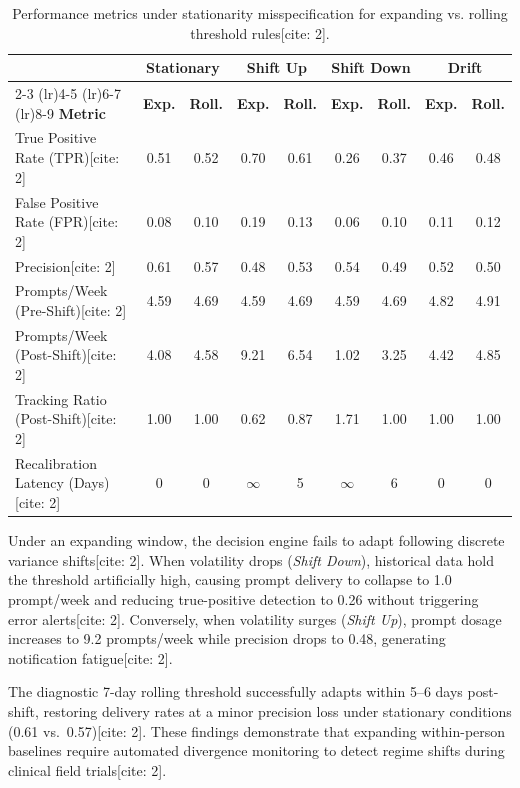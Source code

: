 \documentclass[11pt,letterpaper]{article}
\begin{document}
\begin{table}[htbp]
\centering
\small
\begin{tabular}{@{}lcccccccc@{}}
\toprule
& \multicolumn{2}{c}{\textbf{Stationary}} & \multicolumn{2}{c}{\textbf{Shift Up}} & \multicolumn{2}{c}{\textbf{Shift Down}} & \multicolumn{2}{c}{\textbf{Drift}} \\
\cmidrule(lr){2-3} \cmidrule(lr){4-5} \cmidrule(lr){6-7} \cmidrule(lr){8-9}
\textbf{Metric} & \textbf{Exp.} & \textbf{Roll.} & \textbf{Exp.} & \textbf{Roll.} & \textbf{Exp.} & \textbf{Roll.} & \textbf{Exp.} & \textbf{Roll.} \\
\midrule
True Positive Rate (TPR)[cite: 2] & 0.51 & 0.52 & 0.70 & 0.61 & 0.26 & 0.37 & 0.46 & 0.48 \\
False Positive Rate (FPR)[cite: 2] & 0.08 & 0.10 & 0.19 & 0.13 & 0.06 & 0.10 & 0.11 & 0.12 \\
Precision[cite: 2] & 0.61 & 0.57 & 0.48 & 0.53 & 0.54 & 0.49 & 0.52 & 0.50 \\
Prompts/Week (Pre-Shift)[cite: 2] & 4.59 & 4.69 & 4.59 & 4.69 & 4.59 & 4.69 & 4.82 & 4.91 \\
Prompts/Week (Post-Shift)[cite: 2] & 4.08 & 4.58 & 9.21 & 6.54 & 1.02 & 3.25 & 4.42 & 4.85 \\
Tracking Ratio (Post-Shift)[cite: 2] & 1.00 & 1.00 & 0.62 & 0.87 & 1.71 & 1.00 & 1.00 & 1.00 \\
Recalibration Latency (Days)[cite: 2] & 0 & 0 & $\infty$ & 5 & $\infty$ & 6 & 0 & 0 \\
\bottomrule
\end{tabular}
\caption{Performance metrics under stationarity misspecification for expanding vs. rolling threshold rules[cite: 2].}
\end{table}

Under an expanding window, the decision engine fails to adapt following discrete variance shifts[cite: 2]. When volatility drops (\textit{Shift Down}), historical data hold the threshold artificially high, causing prompt delivery to collapse to 1.0 prompt/week and reducing true-positive detection to 0.26 without triggering error alerts[cite: 2]. Conversely, when volatility surges (\textit{Shift Up}), prompt dosage increases to 9.2 prompts/week while precision drops to 0.48, generating notification fatigue[cite: 2]. 

The diagnostic 7-day rolling threshold successfully adapts within 5--6 days post-shift, restoring delivery rates at a minor precision loss under stationary conditions (0.61 vs.\ 0.57)[cite: 2]. These findings demonstrate that expanding within-person baselines require automated divergence monitoring to detect regime shifts during clinical field trials[cite: 2].
\end{document}
